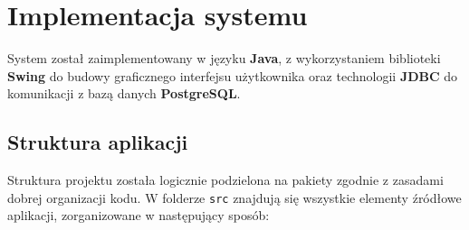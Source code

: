 \section{Implementacja systemu}

System został zaimplementowany w języku \textbf{Java}, z wykorzystaniem biblioteki \textbf{Swing} do budowy graficznego interfejsu użytkownika oraz technologii \textbf{JDBC} do komunikacji z bazą danych \textbf{PostgreSQL}.

\subsection{Struktura aplikacji}

Struktura projektu została logicznie podzielona na pakiety zgodnie z zasadami dobrej organizacji kodu. W folderze \texttt{src} znajdują się wszystkie elementy źródłowe aplikacji, zorganizowane w następujący sposób:

